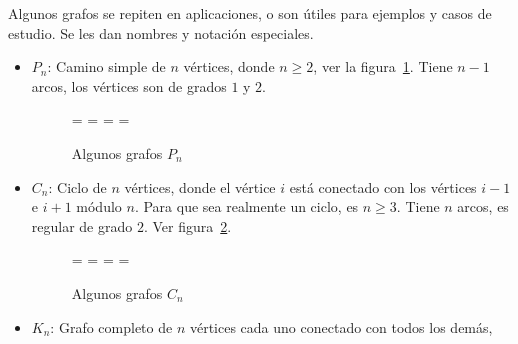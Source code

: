   Algunos grafos se repiten en aplicaciones,
  o son útiles para ejemplos y casos de estudio.
  Se les dan nombres y notación especiales.
  \begin{itemize}
  \item
    \(P_n\): Camino simple de \(n\) vértices,
    donde \(n \ge 2\),
    ver la figura~\ref{fig:Ps}.
    Tiene \(n - 1\) arcos,
    los vértices son de grados \(1\) y \(2\).
    \begin{figure}[htbp]
      \centering
      =\hbox{}
      =\hbox{}
      =\hbox{}
      =\hbox{}
      \centering
      \subfloat[\(P_2\)]{
	\raisebox{0.5\ht5-0.5\ht2}{\copy2}
      }%
      \hspace{2.5em}%
      \subfloat[\(P_3\)]{
	\raisebox{0.5\ht5-0.5\ht3}{\copy3}
      }%
      \hspace{2.5em}%
      \subfloat[\(P_4\)]{
	\raisebox{0.5\ht5-0.5\ht4}{\copy4}
      }%
      \hspace{2.5em}%
      \caption{Algunos grafos $P_n$}
      \label{fig:Ps}
    \end{figure}
  \item
    \(C_n\): Ciclo de \(n\) vértices,
    donde el vértice \(i\) está conectado
    con los vértices \(i - 1\) e \(i + 1\)
    módulo \(n\).
    Para que sea realmente un ciclo,
    es \(n \ge 3\).
    Tiene \(n\) arcos,
    es regular de grado \(2\).
    Ver figura~\ref{fig:Cs}.
    \begin{figure}[htbp]
      =\hbox{}
      =\hbox{}
      =\hbox{}
      =\hbox{}
      \centering
      \subfloat[\(C_3\)]{
	\raisebox{0.5\ht6-0.5\ht3}{\copy3}
      }%
      \hspace{2.5em}%
      \subfloat[\(C_4\)]{
	\raisebox{0.5\ht6-0.5\ht4}{\copy4}
      }%
      \hspace{2.5em}%
      \subfloat[\(C_5\)]{
	\raisebox{0.5\ht6-0.5\ht5}{\copy5}
      }%
      \hspace{2.5em}%
      \caption{Algunos grafos $C_n$}
      \label{fig:Cs}
    \end{figure}
  \item
    \(K_n\): Grafo completo de \(n\) vértices
    cada uno conectado con todos los demás,

\end{itemize}
